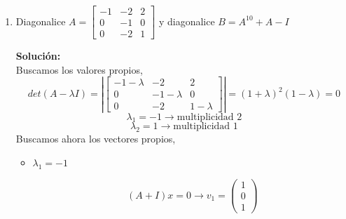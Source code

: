 \documentclass[12pt]{article}
\newenvironment{solucion}
{\begin{mdframed}[backgroundcolor=black!10]
		{\bf Solución:}\\
	}
	{
	\end{mdframed}
}
\newenvironment{preguntas}
{\begin{enumerate}\itemsep12pt
	}
	{
	\end{enumerate}
}
\newcommand{\ra}{\rightarrow}
\begin{document}
\begin{preguntas}
\begin{solucion}
			En nuestro ejercicio, debemos considerar $\lambda_1 = \lambda_2 = 1$ y $\lambda_3 = 3$. Entonces,
			$$P = \begin{bmatrix}
			2 & 0 & 0 \\
			0 & 1 & 1 \\
			-1 & 0 & 1
			\end{bmatrix}, \quad
			D = \begin{bmatrix}
			1 & 0 & 0 \\
			0 & 1 & 0 \\
			0 & 0 & 3
			\end{bmatrix}, \quad
			P^{-1} = \begin{bmatrix}
			\frac{1}{2} & 0 & 0 \\
			-\frac{1}{2} & 1 & -1 \\
			\frac{1}{2} & 0 & 1
			\end{bmatrix}$$
			Sea
			$$R = \sqrt[3]{D} = \begin{bmatrix}
			1 & 0 & 0 \\
			0 & 1 & 0 \\
			0 & 0 & \sqrt[3]{3}
			\end{bmatrix}$$
			y sea
			$$N = PRP^{-1}$$
			Notemos que	
			$$N^3 = (PRP^{-1}) = PR\cancel{P^{-1}P}R\cancel{P^{-1}P}RP^{-1} = PR^3P^{-1} = PDP^{-1} = M$$
			Finalmente, $N = P\sqrt[3]{D}P^{-1}$ es la matriz buscada.
\end{solucion}
\item Diagonalice $A =
	\begin{bmatrix} 
	-1 & -2 & 2 \\
	0 & -1 & 0 \\
	0 & -2 & 1
	\end{bmatrix}$ y diagonalice $B = A^{10} + A - I$ 
\begin{solucion}
Buscamos los valores propios,
		$$det(A-\lambda I) = \left|\begin{bmatrix}
		-1-\lambda & -2 & 2 \\
		0 & -1-\lambda & 0 \\
		0 & -2 & 1-\lambda
		\end{bmatrix}\right|
		= (1+\lambda)^2(1-\lambda) = 0$$
		$$\lambda_1 = -1 \ra \text{multiplicidad 2}$$
		$$\lambda_2 = 1 \ra \text{multiplicidad 1}$$
		Buscamos ahora los vectores propios,
		\begin{itemize}
			\item $\lambda_1 = -1$
			
			$$(A+I)x = 0 \ra v_1 = \begin{pmatrix}
			1 \\ 0 \\ 1
			\end{pmatrix}$$
			

\end{itemize}
\end{solucion}
\end{preguntas}
\end{document}

